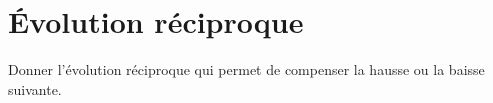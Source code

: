 \begin{questions}
	\question[2] 
\end{questions}

\section{\'Evolution réciproque}

Donner l'évolution réciproque qui permet de compenser la hausse  ou la baisse suivante.

\begin{questions}
	\question[2] 
\end{questions}



